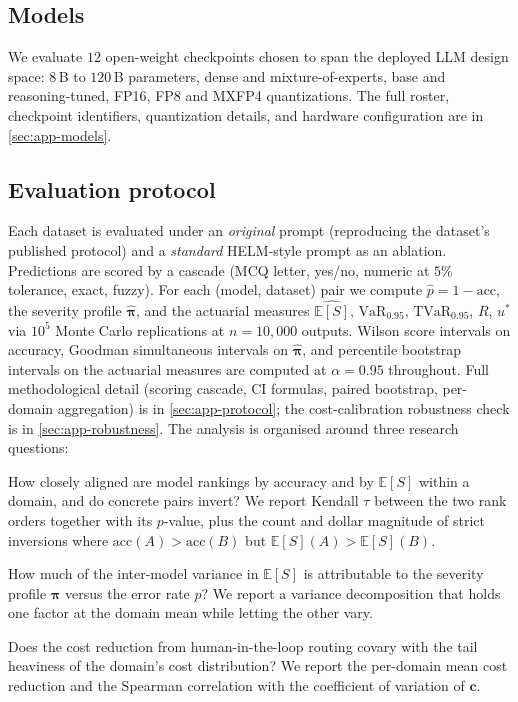 \documentclass[11pt]{article}
\newcommand{\ES}{\mathbb{E}[S]}
\newcommand{\VaR}{\mathrm{VaR}}
\newcommand{\TVaR}{\mathrm{TVaR}}
\newcommand{\bpi}{\boldsymbol{\pi}}
\begin{document}
\subsection{Models}
\label{sec:models}

We evaluate $12$ open-weight checkpoints chosen to span the
deployed LLM design space: $8$\,B to $120$\,B parameters, dense
and mixture-of-experts, base and reasoning-tuned, FP16, FP8 and
MXFP4 quantizations. The full roster, checkpoint identifiers,
quantization details, and hardware configuration are in
\autoref{sec:app-models}.

\subsection{Evaluation protocol}
\label{sec:protocol}

Each dataset is evaluated under an \emph{original} prompt
(reproducing the dataset's published protocol) and a
\emph{standard} HELM-style prompt \citep{liang2023helm} as an
ablation. Predictions are scored by a cascade (MCQ letter, yes/no,
numeric at $5\%$ tolerance, exact, fuzzy). For each (model,
dataset) pair we compute $\hat{p}{=}1{-}\mathrm{acc}$, the
severity profile $\hat{\bpi}$, and the actuarial measures
$\widehat{\ES}$, $\VaR_{0.95}$, $\TVaR_{0.95}$, $R$, $u^\ast$ via
$10^5$ Monte Carlo replications at $n{=}10{,}000$ outputs. Wilson
score intervals on accuracy, Goodman simultaneous intervals on
$\hat{\bpi}$, and percentile bootstrap intervals on the actuarial
measures are computed at $\alpha{=}0.95$ throughout. Full
methodological detail (scoring cascade, CI formulas, paired
bootstrap, per-domain aggregation) is in
\autoref{sec:app-protocol}; the cost-calibration robustness check
is in \autoref{sec:app-robustness}. The analysis is organised
around three research questions:

\begin{description}[leftmargin=0pt,labelindent=0pt]
  \item[RQ1 (Ranking divergence and inversions).] How closely aligned
    are model rankings by accuracy and by $\ES$ within a domain, and
    do concrete pairs invert? We report Kendall $\tau$
    \citep{kendall1938} between the
    two rank orders together with its $p$-value, plus the count and
    dollar magnitude of strict inversions where
    $\mathrm{acc}(A) > \mathrm{acc}(B)$ but $\ES(A) > \ES(B)$.
  \item[RQ2 (Severity vs.\ frequency variance).] How much of the
    inter-model variance in $\ES$ is attributable to the severity
    profile $\bpi$ versus the error rate $p$? We report a variance
    decomposition that holds one factor at the domain mean while
    letting the other vary.
  \item[RQ3 (Routing benefit).] Does the cost reduction from
    human-in-the-loop routing covary with the tail heaviness of the
    domain's cost distribution? We report the per-domain mean cost
    reduction and the Spearman correlation with the coefficient of
    variation of $\mathbf{c}$.
\end{description}
\end{document}
